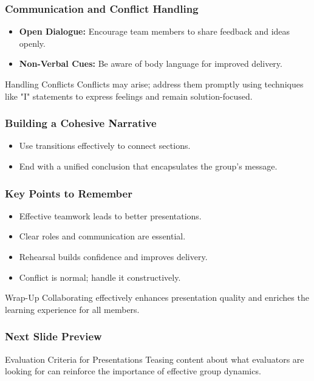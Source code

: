 \documentclass[aspectratio=169]{beamer}
\begin{document}
\begin{frame}[fragile]
    \frametitle{Communication and Conflict Handling}
    \begin{itemize}
        \item \textbf{Open Dialogue:} Encourage team members to share feedback and ideas openly.
        \item \textbf{Non-Verbal Cues:} Be aware of body language for improved delivery.
    \end{itemize}
    \begin{block}{Handling Conflicts}
        Conflicts may arise; address them promptly using techniques like "I" statements to express feelings and remain solution-focused.
    \end{block}
\end{frame}

\begin{frame}[fragile]
    \frametitle{Building a Cohesive Narrative}
    \begin{itemize}
        \item Use transitions effectively to connect sections.
        \item End with a unified conclusion that encapsulates the group's message.
    \end{itemize}
\end{frame}

\begin{frame}[fragile]
    \frametitle{Key Points to Remember}
    \begin{itemize}
        \item Effective teamwork leads to better presentations.
        \item Clear roles and communication are essential.
        \item Rehearsal builds confidence and improves delivery.
        \item Conflict is normal; handle it constructively.
    \end{itemize}
    \begin{block}{Wrap-Up}
        Collaborating effectively enhances presentation quality and enriches the learning experience for all members.
    \end{block}
\end{frame}

\begin{frame}[fragile]
    \frametitle{Next Slide Preview}
    \begin{block}{Evaluation Criteria for Presentations}
        Teasing content about what evaluators are looking for can reinforce the importance of effective group dynamics.
    \end{block}
\end{frame}
\end{document}
